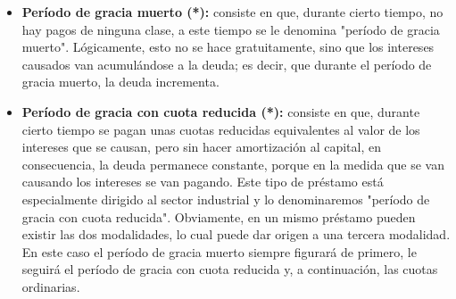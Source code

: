 \begin{itemize}
	\item\textbf{ Período de gracia muerto (*):} consiste en que, durante cierto tiempo, no hay pagos de ninguna clase, a este tiempo se le denomina "período de gracia muerto". Lógicamente, esto no se hace gratuitamente, sino que los intereses causados van acumulándose a la deuda; es decir, que durante el período de gracia muerto, la deuda incrementa. \\
	\item \textbf{Período de gracia con cuota reducida (*):} consiste en que, durante cierto tiempo se pagan unas cuotas reducidas equivalentes al valor de los intereses que se causan, pero sin hacer amortización al capital, en consecuencia, la deuda permanece constante, porque en la medida que se van causando los intereses se van pagando. Este tipo de préstamo está especialmente dirigido al sector industrial y lo denominaremos "período de gracia con cuota reducida". Obviamente, en un mismo préstamo pueden existir las dos modalidades, lo cual puede dar origen a una tercera modalidad. En este caso el período de gracia muerto siempre figurará de primero, le seguirá el período de gracia con cuota reducida y, a continuación, las cuotas ordinarias.\\
\end{itemize}





